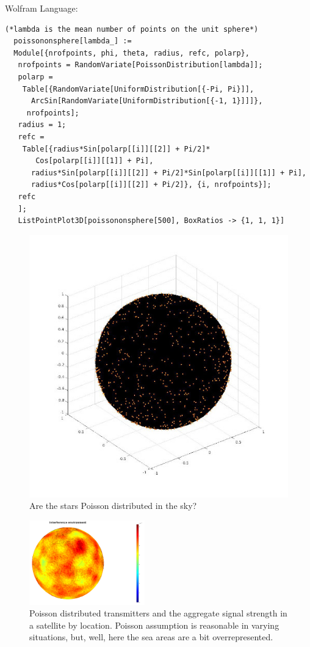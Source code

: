 \documentclass{article}
\begin{document}
Wolfram Language:
\begin{verbatim}
(*lambda is the mean number of points on the unit sphere*) 
  poissononsphere[lambda_] := 
  Module[{nrofpoints, phi, theta, radius, refc, polarp}, 
   nrofpoints = RandomVariate[PoissonDistribution[lambda]];
   polarp = 
    Table[{RandomVariate[UniformDistribution[{-Pi, Pi}]], 
      ArcSin[RandomVariate[UniformDistribution[{-1, 1}]]]}, 
     nrofpoints];
   radius = 1;
   refc = 
    Table[{radius*Sin[polarp[[i]][[2]] + Pi/2]*
       Cos[polarp[[i]][[1]] + Pi],
      radius*Sin[polarp[[i]][[2]] + Pi/2]*Sin[polarp[[i]][[1]] + Pi],
      radius*Cos[polarp[[i]][[2]] + Pi/2]}, {i, nrofpoints}];
   refc
   ];
   ListPointPlot3D[poissononsphere[500], BoxRatios -> {1, 1, 1}]  
\end{verbatim}

\begin{figure}
  \includegraphics[width=\linewidth]{poissononsphere.jpg}
  \caption{Are the stars Poisson distributed in the sky?}
\end{figure}

\begin{figure}
  \includegraphics[width=5cm]{interferenceenvironment.png}
  \caption{Poisson distributed transmitters and the aggregate signal strength in a satellite by location. Poisson assumption is reasonable in varying situations, but, well, here the sea areas are a bit overrepresented.  }
\end{figure}
\end{document}
